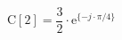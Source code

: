 \begin{center}
\[
\textrm{C}[2] = \frac{3}{2} \cdot \textrm{e}^{\{-j \cdot \pi/4 \}}
\]
\end{center}
